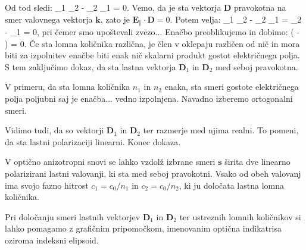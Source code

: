 Od tod sledi:
\beq
{}_1 \cdot {}_2 - _2 \cdot {}_1 = 0.
\eeq
Vemo, da je sta vektorja $\mathbf{D}$ pravokotna na smer valovnega vektorja $\mathbf{k}$,
zato je $\mathbf{E}_\parallel \cdot \mathbf{D} = 0$. Potem velja:
\beq
{}_{1\perp} \cdot {}_2 - _{2\perp} \cdot {}_1 =
\cdot {}_2 - 
\cdot {}_1 = 0,
\eeq
pri čemer smo upoštevali zvezo... Enačbo preoblikujemo in dobimo:
\beq
{}\left(  - 
\right) = 0.
\eeq
Če sta lomna količnika različna, je člen v oklepaju različen od nič in mora 
biti za izpolnitev enačbe biti enak nič skalarni produkt gostot električnega
polja. S tem zaključimo dokaz, da sta lastna vektorja $\mathbf{D}_1$ in 
$\mathbf{D}_2$ med seboj pravokotna. 

V primeru, da sta lomna količnika $n_1$ in $n_2$ enaka, sta smeri gostote
električnega polja poljubni saj je enačba... vedno izpolnjena. Navadno 
izberemo ortogonalni smeri.

Vidimo tudi, da so vektorji $\mathbf{D}_1$ in $\mathbf{D}_2$ ter razmerje med njima
realni. To pomeni, da sta lastni polarizaciji linearni. 
Konec dokaza.

V optično anizotropni snovi se lahko vzdolž izbrane smeri $\mathbf{s}$ 
širita dve linearno polarizirani lastni valovanji, ki sta med seboj pravokotni. 
Vsako od obeh valovanj ima svojo fazno hitrost $c_1= c_0/n_1$ in $c_2 = c_0/n_2$,
ki ju določata lastna lomna količnika.

Pri določanju smeri lastnih vektorjev $\mathbf{D}_1$ in $\mathbf{D}_2$ 
ter ustreznih lomnih količnikov si lahko pomagamo z grafičnim pripomočkom, imenovanim
optična indikatrisa oziroma indeksni elipsoid. 

